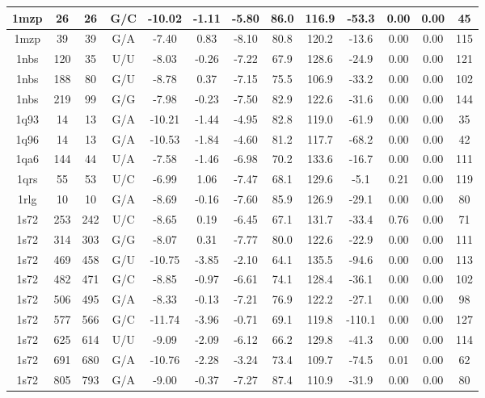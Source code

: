 {\begin{center}
\begin{longtable}{|c|c|c|c|c|c|c|c|c|c|c|c|c|}
1mzp & 26 & 26 & G/C & -10.02 & -1.11 & -5.80 & 86.0 & 116.9 & -53.3 & 0.00 & 0.00 & 45 \\ \hline
1mzp & 39 & 39 & G/A & -7.40 & 0.83 & -8.10 & 80.8 & 120.2 & -13.6 & 0.00 & 0.00 & 115 \\ \hline
1nbs & 120 & 35 & U/U & -8.03 & -0.26 & -7.22 & 67.9 & 128.6 & -24.9 & 0.00 & 0.00 & 121 \\ \hline
1nbs & 188 & 80 & G/U & -8.78 & 0.37 & -7.15 & 75.5 & 106.9 & -33.2 & 0.00 & 0.00 & 102 \\ \hline
1nbs & 219 & 99 & G/G & -7.98 & -0.23 & -7.50 & 82.9 & 122.6 & -31.6 & 0.00 & 0.00 & 144 \\ \hline
1q93 & 14 & 13 & G/A & -10.21 & -1.44 & -4.95 & 82.8 & 119.0 & -61.9 & 0.00 & 0.00 & 35 \\ \hline
1q96 & 14 & 13 & G/A & -10.53 & -1.84 & -4.60 & 81.2 & 117.7 & -68.2 & 0.00 & 0.00 & 42 \\ \hline
1qa6 & 144 & 44 & U/A & -7.58 & -1.46 & -6.98 & 70.2 & 133.6 & -16.7 & 0.00 & 0.00 & 111 \\ \hline
1qrs & 55 & 53 & U/C & -6.99 & 1.06 & -7.47 & 68.1 & 129.6 & -5.1 & 0.21 & 0.00 & 119 \\ \hline
1rlg & 10 & 10 & G/A & -8.69 & -0.16 & -7.60 & 85.9 & 126.9 & -29.1 & 0.00 & 0.00 & 80 \\ \hline
1s72 & 253 & 242 & U/C & -8.65 & 0.19 & -6.45 & 67.1 & 131.7 & -33.4 & 0.76 & 0.00 & 71 \\ \hline
1s72 & 314 & 303 & G/G & -8.07 & 0.31 & -7.77 & 80.0 & 122.6 & -22.9 & 0.00 & 0.00 & 111 \\ \hline
1s72 & 469 & 458 & G/U & -10.75 & -3.85 & -2.10 & 64.1 & 135.5 & -94.6 & 0.00 & 0.00 & 113 \\ \hline
1s72 & 482 & 471 & G/C & -8.85 & -0.97 & -6.61 & 74.1 & 128.4 & -36.1 & 0.00 & 0.00 & 102 \\ \hline
1s72 & 506 & 495 & G/A & -8.33 & -0.13 & -7.21 & 76.9 & 122.2 & -27.1 & 0.00 & 0.00 & 98 \\ \hline
1s72 & 577 & 566 & G/C & -11.74 & -3.96 & -0.71 & 69.1 & 119.8 & -110.1 & 0.00 & 0.00 & 127 \\ \hline
1s72 & 625 & 614 & U/U & -9.09 & -2.09 & -6.12 & 66.2 & 129.8 & -41.3 & 0.00 & 0.00 & 114 \\ \hline
1s72 & 691 & 680 & G/A & -10.76 & -2.28 & -3.24 & 73.4 & 109.7 & -74.5 & 0.01 & 0.00 & 62 \\ \hline
1s72 & 805 & 793 & G/A & -9.00 & -0.37 & -7.27 & 87.4 & 110.9 & -31.9 & 0.00 & 0.00 & 80 \\ \hline

\end{longtable}
\end{center}}
